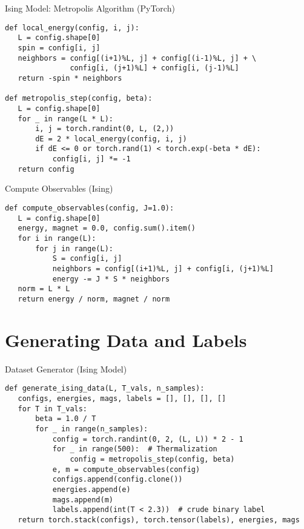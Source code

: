\documentclass{beamer}
\begin{document}
\begin{frame}[fragile]{Ising Model: Metropolis Algorithm (PyTorch)}
\begin{lstlisting}
def local_energy(config, i, j):
   L = config.shape[0]
   spin = config[i, j]
   neighbors = config[(i+1)%L, j] + config[(i-1)%L, j] + \
               config[i, (j+1)%L] + config[i, (j-1)%L]
   return -spin * neighbors

def metropolis_step(config, beta):
   L = config.shape[0]
   for _ in range(L * L):
       i, j = torch.randint(0, L, (2,))
       dE = 2 * local_energy(config, i, j)
       if dE <= 0 or torch.rand(1) < torch.exp(-beta * dE):
           config[i, j] *= -1
   return config
\end{lstlisting}
\end{frame}

\begin{frame}[fragile]{Compute Observables (Ising)}
\begin{lstlisting}
def compute_observables(config, J=1.0):
   L = config.shape[0]
   energy, magnet = 0.0, config.sum().item()
   for i in range(L):
       for j in range(L):
           S = config[i, j]
           neighbors = config[(i+1)%L, j] + config[i, (j+1)%L]
           energy -= J * S * neighbors
   norm = L * L
   return energy / norm, magnet / norm
\end{lstlisting}
\end{frame}


\section{Generating Data and Labels}

\begin{frame}[fragile]{Dataset Generator (Ising Model)}
\begin{lstlisting}
def generate_ising_data(L, T_vals, n_samples):
   configs, energies, mags, labels = [], [], [], []
   for T in T_vals:
       beta = 1.0 / T
       for _ in range(n_samples):
           config = torch.randint(0, 2, (L, L)) * 2 - 1
           for _ in range(500):  # Thermalization
               config = metropolis_step(config, beta)
           e, m = compute_observables(config)
           configs.append(config.clone())
           energies.append(e)
           mags.append(m)
           labels.append(int(T < 2.3))  # crude binary label
   return torch.stack(configs), torch.tensor(labels), energies, mags
\end{lstlisting}
\end{frame}
\end{document}
